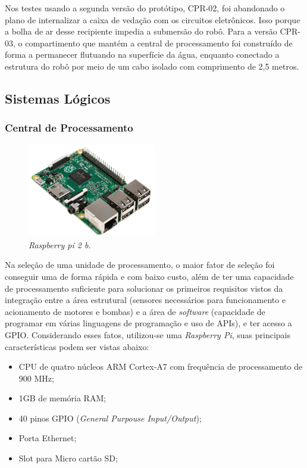Nos testes usando a segunda versão do protótipo, CPR-02, foi abandonado o plano de internalizar a caixa de vedação com os circuitos eletrônicos. Isso porque a bolha de ar desse recipiente impedia a submersão do robô. Para a versão CPR-03, o compartimento que mantém a central de processamento foi construído de forma a permanecer flutuando na superfície da água, enquanto conectado a estrutura do robô por meio de um cabo isolado com comprimento de 2,5 metros. 

\subsection{Sistemas Lógicos}
\subsubsection{Central de Processamento}

\begin{figure}[h]
  \centering
  \includegraphics[width=0.5\textwidth]{figuras/rpi2b.jpg}
  \caption{\textit{Raspberry pi 2 b}.}
  \label{fig:rpi2b}
\end{figure}
\FloatBarrier

Na seleção de uma unidade de processamento, o maior fator de seleção foi conseguir uma de forma rápida e com baixo custo, além de ter uma capacidade de processamento suficiente para solucionar os primeiros requisitos vistos da integração entre a área estrutural (sensores necessários para funcionamento e acionamento de motores e bombas) e a área de \textit{software} (capacidade de programar em várias linguagens de programação e uso de APIs), e ter acesso a GPIO. Considerando esses fatos, utilizou-se uma \textit{Raspberry Pi}, suas principais características podem ser vistas abaixo:

\begin{itemize}
\item CPU de quatro núcleos ARM Cortex-A7 com frequência de processamento de 900 MHz;
\item 1GB de memória RAM;
\item 40 pinos GPIO (\textit{General Purpouse Input/Output});
\item Porta Ethernet;
\item Slot para Micro cartão SD;
\end{itemize}

